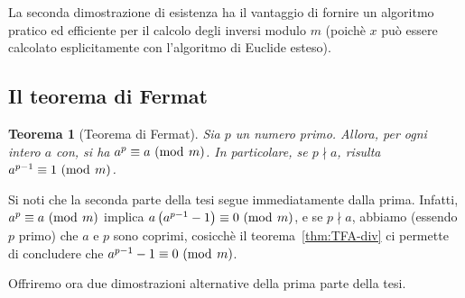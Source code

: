 \documentclass[pdflatex,11pt,a4paper,oneside]{article}
\newcommand{\p}[1]{\left({#1}\right)}
\newcommand{\notdivides}[0]{\nmid}
\newcommand{\congruent}[0]{\equiv}
\newcommand{\mmodop}[0]{\ensuremath{\operatorname{mod}}}
\newcommand{\mmod}[1]{\ensuremath{\allowbreak\ (\mmodop\:{#1})}}
\newtheorem{theorem}[TheoremLike]{Teorema}
\begin{document}
La seconda dimostrazione di esistenza ha il vantaggio di fornire un
algoritmo pratico ed efficiente per il calcolo degli inversi modulo $m$
(poich\`e $x$ pu\`o essere calcolato esplicitamente con l'algoritmo di
Euclide esteso).


\subsection{Il teorema di Fermat}

\begin{theorem}[Teorema di Fermat]\label{thm:fermat}
Sia $p$ un numero primo. Allora, per ogni intero $a$ con, si ha
$a^p \congruent a \mmod m$.  In particolare, se $p \notdivides a$,
risulta $a^{p-1} \congruent 1 \mmod m$.
\end{theorem}

Si noti che la seconda parte della tesi segue immediatamente dalla prima.
Infatti, $a^p \congruent a \mmod m$ implica $a\p{a^{p-1} - 1} \congruent
0 \mmod m$, e se $p \notdivides a$, abbiamo (essendo $p$ primo) che
$a$ e $p$ sono coprimi, cosicch\`e il teorema~\eqref{thm:TFA-div} ci
permette di concludere che $a^{p-1} - 1 \congruent 0 \mmod m$.

\bigskip
\noindent
Offriremo ora due dimostrazioni alternative della prima parte della tesi.
\end{document}
